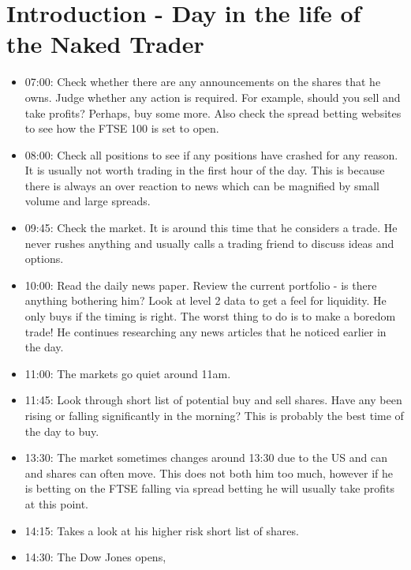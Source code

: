 \section*{Introduction - Day in the life of the Naked Trader}
\begin{itemize}
\item 07:00: Check whether there are any announcements on the shares that he owns. 
Judge whether any action is required. 
For example, should you sell and take profits? 
Perhaps, buy some more.
Also check the spread betting websites to see how the FTSE 100 is set to open.
\item 08:00: Check all positions to see if any positions have crashed for any reason.
It is usually not worth trading in the first hour of the day.
This is because there is always an over reaction to news which can be magnified by small volume and large spreads.
\item 09:45: Check the market. It is around this time that he considers a trade.
He never rushes anything and usually calls a trading friend to discuss ideas and options.
\item 10:00: Read the daily news paper.
Review the current portfolio - is there anything bothering him? 
Look at level 2 data to get a feel for liquidity.
He only buys if the timing is right.
The worst thing to do is to make a boredom trade!
He continues researching any news articles that he noticed earlier in the day.
\item 11:00: The markets go quiet around 11am.
\item 11:45: Look through short list of potential buy and sell shares.
Have any been rising or falling significantly in the morning?
This is probably the best time of the day to buy.
\item 13:30: The market sometimes changes around 13:30 due to the US and can and shares can often move.
This does not both him too much, however if he is betting on the FTSE falling via spread betting he will usually take profits at this point.
\item 14:15: Takes a look at his higher risk short list of shares.
\item 14:30: The Dow Jones opens,

\end{itemize}
